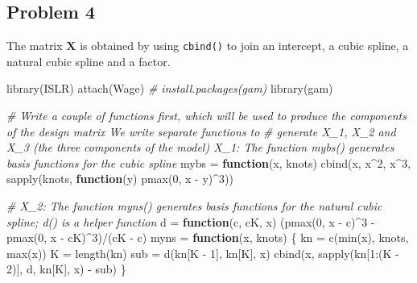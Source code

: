 \documentclass[
]{article}
\newenvironment{Shaded}{\begin{snugshade}}{\end{snugshade}}
\newcommand{\CommentTok}[1]{\textcolor[rgb]{0.56,0.35,0.01}{\textit{#1}}}
\newcommand{\ControlFlowTok}[1]{\textcolor[rgb]{0.13,0.29,0.53}{\textbf{#1}}}
\newcommand{\DecValTok}[1]{\textcolor[rgb]{0.00,0.00,0.81}{#1}}
\newcommand{\FunctionTok}[1]{\textcolor[rgb]{0.00,0.00,0.00}{#1}}
\newcommand{\NormalTok}[1]{#1}
\newcommand{\OtherTok}[1]{\textcolor[rgb]{0.56,0.35,0.01}{#1}}
\newcommand{\SpecialCharTok}[1]{\textcolor[rgb]{0.00,0.00,0.00}{#1}}
\begin{document}
\hypertarget{problem-4}{%
\subsection{Problem 4}\label{problem-4}}

The matrix \(\mathbf X\) is obtained by using \texttt{cbind()} to join
an intercept, a cubic spline, a natural cubic spline and a factor.

\begin{Shaded}
\begin{Highlighting}[]
\FunctionTok{library}\NormalTok{(ISLR)}
\FunctionTok{attach}\NormalTok{(Wage)}
\CommentTok{\# install.packages(\textquotesingle{}gam\textquotesingle{})}
\FunctionTok{library}\NormalTok{(gam)}

\CommentTok{\# Write a couple of functions first, which will be used to produce the components of the design matrix We write separate functions to}
\CommentTok{\# generate X\_1, X\_2 and X\_3 (the three components of the model) X\_1: The function mybs() generates basis functions for the cubic spline}
\NormalTok{mybs }\OtherTok{=} \ControlFlowTok{function}\NormalTok{(x, knots) }\FunctionTok{cbind}\NormalTok{(x, x}\SpecialCharTok{\^{}}\DecValTok{2}\NormalTok{, x}\SpecialCharTok{\^{}}\DecValTok{3}\NormalTok{, }\FunctionTok{sapply}\NormalTok{(knots, }\ControlFlowTok{function}\NormalTok{(y) }\FunctionTok{pmax}\NormalTok{(}\DecValTok{0}\NormalTok{, x }\SpecialCharTok{{-}}\NormalTok{ y)}\SpecialCharTok{\^{}}\DecValTok{3}\NormalTok{))}

\CommentTok{\# X\_2: The function myns() generates basis functions for the natural cubic spline; d() is a helper function}
\NormalTok{d }\OtherTok{=} \ControlFlowTok{function}\NormalTok{(c, cK, x) (}\FunctionTok{pmax}\NormalTok{(}\DecValTok{0}\NormalTok{, x }\SpecialCharTok{{-}}\NormalTok{ c)}\SpecialCharTok{\^{}}\DecValTok{3} \SpecialCharTok{{-}} \FunctionTok{pmax}\NormalTok{(}\DecValTok{0}\NormalTok{, x }\SpecialCharTok{{-}}\NormalTok{ cK)}\SpecialCharTok{\^{}}\DecValTok{3}\NormalTok{)}\SpecialCharTok{/}\NormalTok{(cK }\SpecialCharTok{{-}}\NormalTok{ c)}
\NormalTok{myns }\OtherTok{=} \ControlFlowTok{function}\NormalTok{(x, knots) \{}
\NormalTok{    kn }\OtherTok{=} \FunctionTok{c}\NormalTok{(}\FunctionTok{min}\NormalTok{(x), knots, }\FunctionTok{max}\NormalTok{(x))}
\NormalTok{    K }\OtherTok{=} \FunctionTok{length}\NormalTok{(kn)}
\NormalTok{    sub }\OtherTok{=} \FunctionTok{d}\NormalTok{(kn[K }\SpecialCharTok{{-}} \DecValTok{1}\NormalTok{], kn[K], x)}
    \FunctionTok{cbind}\NormalTok{(x, }\FunctionTok{sapply}\NormalTok{(kn[}\DecValTok{1}\SpecialCharTok{:}\NormalTok{(K }\SpecialCharTok{{-}} \DecValTok{2}\NormalTok{)], d, kn[K], x) }\SpecialCharTok{{-}}\NormalTok{ sub)}
\NormalTok{\}}


\end{Highlighting}
\end{Shaded}
\end{document}
